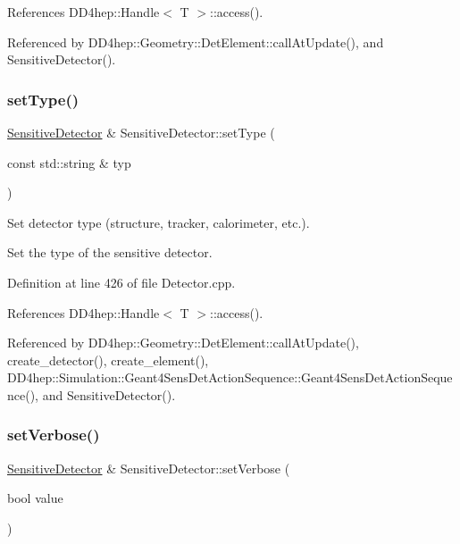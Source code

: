 References D\+D4hep\+::\+Handle$<$ T $>$\+::access().



Referenced by D\+D4hep\+::\+Geometry\+::\+Det\+Element\+::call\+At\+Update(), and Sensitive\+Detector().

\hypertarget{class_d_d4hep_1_1_geometry_1_1_sensitive_detector_afe67bf4bb87340757c66a68fb410bf94}{}\label{class_d_d4hep_1_1_geometry_1_1_sensitive_detector_afe67bf4bb87340757c66a68fb410bf94} 
\subsubsection{\texorpdfstring{set\+Type()}{setType()}}
{\footnotesize\ttfamily \hyperlink{class_d_d4hep_1_1_geometry_1_1_sensitive_detector}{Sensitive\+Detector} \& Sensitive\+Detector\+::set\+Type (\begin{DoxyParamCaption}\item[{const std\+::string \&}]{typ }\end{DoxyParamCaption})}



Set detector type (structure, tracker, calorimeter, etc.). 

Set the type of the sensitive detector. 

Definition at line 426 of file Detector.\+cpp.



References D\+D4hep\+::\+Handle$<$ T $>$\+::access().



Referenced by D\+D4hep\+::\+Geometry\+::\+Det\+Element\+::call\+At\+Update(), create\+\_\+detector(), create\+\_\+element(), D\+D4hep\+::\+Simulation\+::\+Geant4\+Sens\+Det\+Action\+Sequence\+::\+Geant4\+Sens\+Det\+Action\+Sequence(), and Sensitive\+Detector().

\hypertarget{class_d_d4hep_1_1_geometry_1_1_sensitive_detector_ae6c42b0c547eb06bddfd84c27a5b9e87}{}\label{class_d_d4hep_1_1_geometry_1_1_sensitive_detector_ae6c42b0c547eb06bddfd84c27a5b9e87} 
\subsubsection{\texorpdfstring{set\+Verbose()}{setVerbose()}}
{\footnotesize\ttfamily \hyperlink{class_d_d4hep_1_1_geometry_1_1_sensitive_detector}{Sensitive\+Detector} \& Sensitive\+Detector\+::set\+Verbose (\begin{DoxyParamCaption}\item[{bool}]{value }\end{DoxyParamCaption})}



